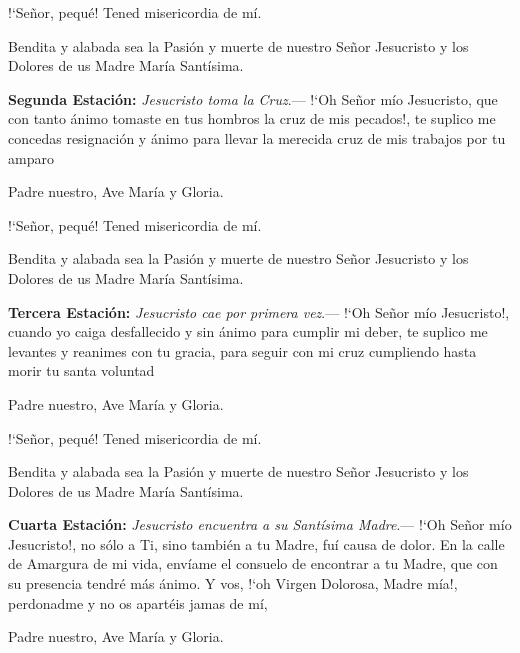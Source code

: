 \documentclass[10pt]{article}
\begin{document}
\begin{multicols}{2}
      {!`}Señor, pequé! Tened misericordia de mí.

      Bendita y alabada sea la Pasión y muerte de nuestro Señor Jesucristo y los Dolores de us Madre María Santísima.

      \vspace{2mm}

      \textbf{Segunda Estación:} \textit{Jesucristo toma la Cruz}.--- {!`}Oh Señor mío Jesucristo, que con tanto ánimo tomaste en tus hombros la cruz de mis pecados!, 
      te suplico me concedas resignación y ánimo para llevar la merecida cruz de mis trabajos por tu amparo

      \vspace{2mm}

      Padre nuestro, Ave María y Gloria.

      {!`}Señor, pequé! Tened misericordia de mí.

      Bendita y alabada sea la Pasión y muerte de nuestro Señor Jesucristo y los Dolores de us Madre María Santísima.

      \vspace{2mm}

      \textbf{Tercera Estación:} \textit{Jesucristo cae por primera vez}.--- {!`}Oh Señor mío Jesucristo!, cuando yo caiga desfallecido y sin ánimo para cumplir mi deber,
      te suplico me levantes y reanimes con tu gracia, para seguir con mi cruz cumpliendo hasta morir tu santa voluntad

      \vspace{2mm}

      Padre nuestro, Ave María y Gloria.

      {!`}Señor, pequé! Tened misericordia de mí.

      Bendita y alabada sea la Pasión y muerte de nuestro Señor Jesucristo y los Dolores de us Madre María Santísima.

      \vspace{2mm}

      \textbf{Cuarta Estación:} \textit{Jesucristo encuentra a su Santísima Madre}.--- {!`}Oh Señor mío Jesucristo!, no sólo a Ti, sino también a tu Madre, fuí causa de dolor. En la calle de
      Amargura de mi vida, envíame el consuelo de encontrar a tu Madre, que con su presencia tendré más ánimo. Y vos, {!`}oh Virgen Dolorosa, Madre mía!, perdonadme y no os apartéis jamas de mí,

      \vspace{2mm}

      Padre nuestro, Ave María y Gloria.


\end{multicols}
\end{document}
